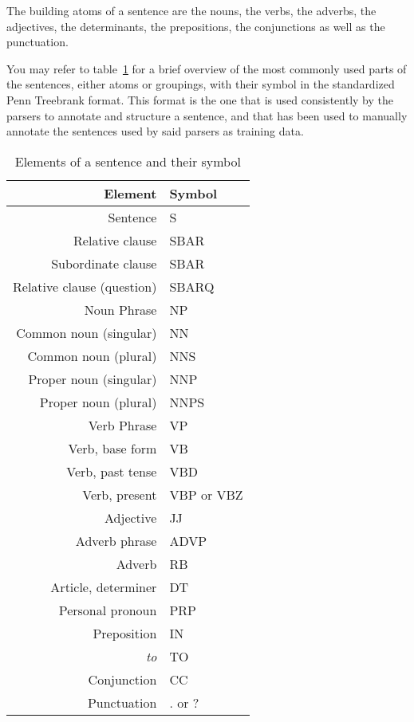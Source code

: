 The building atoms of a sentence are the nouns, the verbs, the adverbs, the adjectives, the determinants, the prepositions, the conjunctions as well as the punctuation.

You may refer to table~\ref{penntree_symbols} for a brief overview of the most commonly used parts of the sentences, either atoms or groupings, with their symbol in the standardized Penn Treebrank format. This format is the one that is used consistently by the parsers to annotate and structure a sentence, and that has been used to manually annotate the sentences used by said parsers as training data.

\begin{table}[ht]
  \caption{Elements of a sentence and their symbol}
  \label{penntree_symbols}
  \begin{center}
  \begin{tabular}{r l}
  Element & Symbol\\
  \hline
  Sentence & S\\
  Relative clause & SBAR\\
  Subordinate clause & SBAR\\
  Relative clause (question) & SBARQ\\
  Noun Phrase & NP\\
  Common noun (singular) & NN\\
  Common noun (plural) & NNS\\
  Proper noun (singular) & NNP\\
  Proper noun (plural) & NNPS\\
  Verb Phrase & VP\\
  Verb, base form & VB\\
  Verb, past tense & VBD\\
  Verb, present & VBP or VBZ\\
  Adjective & JJ\\
  Adverb phrase & ADVP\\
  Adverb & RB\\
  Article, determiner & DT\\
  Personal pronoun & PRP\\
  Preposition & IN\\
  \emph{to} & TO\\
  Conjunction & CC\\
  Punctuation & . or ?\\
  \end{tabular}
  \end{center}
\end{table}

